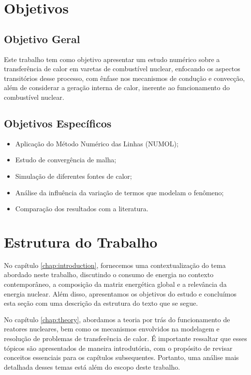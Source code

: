 \section{Objetivos}

\subsection{Objetivo Geral}

Este trabalho tem como objetivo apresentar um estudo numérico sobre a transferência de calor em varetas de combustível nuclear, enfocando os aspectos transitórios desse processo, com ênfase nos mecanismos de condução e convecção, além de considerar a geração interna de calor, inerente ao funcionamento do combustível nuclear.

\subsection{Objetivos Específicos}

\begin{itemize}
    \item Aplicação do Método Numérico das Linhas (NUMOL);
    \item Estudo de convergência de malha;
    \item Simulação de diferentes fontes de calor;
    \item Análise da influência da variação de termos que modelam o fenômeno;
    \item Comparação dos resultados com a literatura.
\end{itemize}

\section{Estrutura do Trabalho}

No capítulo \ref{chap:introduction}, fornecemos uma contextualização do tema abordado neste trabalho, discutindo o consumo de energia no contexto contemporâneo, a composição da matriz energética global e a relevância da energia nuclear. Além disso, apresentamos os objetivos do estudo e concluímos esta seção com uma descrição da estrutura do texto que se segue.

No capítulo \ref{chap:theory}, abordamos a teoria por trás do funcionamento de reatores nucleares, bem como os mecanismos envolvidos na modelagem e resolução de problemas de transferência de calor. É importante ressaltar que esses tópicos são apresentados de maneira introdutória, com o propósito de revisar conceitos essenciais para os capítulos subsequentes. Portanto, uma análise mais detalhada desses temas está além do escopo deste trabalho.

